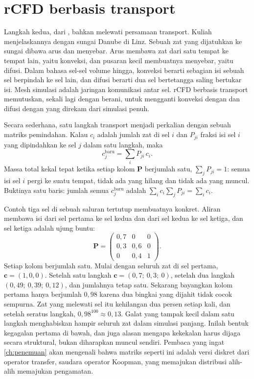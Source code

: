 \section{rCFD berbasis transport}

Langkah kedua, dari \citet{pirker2018}, bahkan melewati persamaan transport. Kuliah menjelaskannya dengan
sungai Danube di Linz. Sebuah zat yang dijatuhkan ke sungai dibawa arus dan menyebar. Arus membawa zat
dari satu tempat ke tempat lain, yaitu konveksi, dan pusaran kecil membuatnya menyebar, yaitu difusi.
Dalam bahasa sel-sel volume hingga, konveksi berarti sebagian isi sebuah sel berpindah ke sel lain, dan
difusi berarti dua sel bertetangga saling bertukar isi. Mesh simulasi adalah jaringan komunikasi antar
sel. rCFD berbasis transport memutuskan, sekali lagi dengan berani, untuk mengganti konveksi dengan
 dan difusi dengan  yang direkam dari simulasi penuh.

Secara sederhana, satu langkah transport menjadi perkalian dengan sebuah matriks pemindahan. Kalau $c_i$
adalah jumlah zat di sel $i$ dan $P_{ji}$ fraksi isi sel $i$ yang dipindahkan ke sel $j$ dalam satu
langkah, maka
\begin{equation}
c_j^{\mathrm{baru}}=\sum_iP_{ji}\,c_i.
\end{equation}
Massa total kekal tepat ketika setiap kolom $\bm P$ berjumlah satu, $\sum_jP_{ji}=1$: semua isi sel $i$
pergi ke suatu tempat, tidak ada yang hilang dan tidak ada yang muncul. Buktinya satu baris: jumlah semua $c_j^{\mathrm{baru}}$
adalah $\sum_i c_i\sum_jP_{ji}=\sum_ic_i$.

Contoh tiga sel di sebuah saluran tertutup membuatnya konkret. Aliran membawa isi dari sel pertama ke sel kedua dan
dari sel kedua ke sel ketiga, dan sel ketiga adalah ujung buntu:
\begin{equation}
\bm P=\begin{pmatrix}0{,}7&0&0\\0{,}3&0{,}6&0\\0&0{,}4&1\end{pmatrix}.
\end{equation}
Setiap kolom berjumlah satu. Mulai dengan seluruh zat di sel pertama, $\bm c=(1,0,0)$. Setelah satu langkah
$\bm c=(0{,}7;\ 0{,}3;\ 0)$, setelah dua langkah $(0{,}49;\ 0{,}39;\ 0{,}12)$, dan jumlahnya tetap satu. Sekarang bayangkan
kolom pertama hanya berjumlah $0{,}98$ karena dua bingkai yang dijahit tidak cocok sempurna. Zat yang melewati sel itu
kehilangan dua persen setiap kali, dan setelah seratus langkah, $0{,}98^{100}\approx0{,}13$. Galat yang tampak kecil
dalam satu langkah menghabiskan hampir seluruh zat dalam simulasi panjang. Inilah bentuk kegagalan pertama di bawah,
dan juga alasan mengapa kekekalan harus dijaga secara struktural, bukan diharapkan muncul sendiri. Pembaca yang ingat \cref{ch:penemuan}
akan mengenali bahwa matriks seperti ini adalah versi diskret dari operator transfer, saudara operator
Koopman, yang memajukan distribusi alih-alih memajukan pengamatan.

